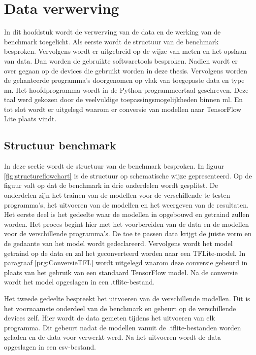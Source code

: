 \chapter{Data verwerving}
In dit hoofdstuk wordt de verwerving van de data en de werking van de benchmark toegelicht. Als eerste wordt de structuur van de benchmark besproken. Vervolgens wordt er uitgebreid op de wijze van meten en het opslaan van data. Dan worden de gebruikte softwaretools besproken. Nadien wordt er over gegaan op de devices die gebruikt worden in deze thesis. Vervolgens worden de gehanteerde programma's doorgenomen op vlak van toegepaste data en type \gls{nn}. Het hoofdprogramma wordt in de Python-programmeertaal geschreven. Deze taal werd gekozen door de veelvuldige toepassingsmogelijkheden binnen \gls{ml}. En tot slot wordt er uitgelegd waarom er conversie van modellen naar TensorFlow Lite plaats vindt.

\section{Structuur benchmark}
In deze sectie wordt de structuur van de benchmark besproken. In figuur \ref{fig:structureflowchart} is de structuur op schematische wijze gepresenteerd. Op de figuur valt op dat de benchmark in drie onderdelen wordt gesplitst. De onderdelen zijn het trainen van de modellen voor de verschillende te testen programma's, het uitvoeren van de modellen en het weergeven van de resultaten. \\

Het eerste deel is het gedeelte waar de modellen in opgebouwd en getraind zullen worden. Het proces begint hier met het voorbereiden van de data en de modellen voor de verschillende programma's. De toe te passen data krijgt de juiste vorm en de gedaante van het model wordt gedeclareerd. Vervolgens wordt het model getraind op de data en zal het geconverteerd worden naar een TFLite-model. In paragraaf \ref{prg:ConversieTFL} wordt uitgelegd waarom deze conversie gebeurd in plaats van het gebruik van een standaard TensorFlow model. Na de conversie wordt het model opgeslagen in een .tflite-bestand.

Het tweede gedeelte bespreekt het uitvoeren van de verschillende modellen. Dit is het voornaamste onderdeel van de benchmark en gebeurt op de verschillende devices zelf. Hier wordt de data gemeten tijdens het uitvoeren van elk programma. Dit gebeurt nadat de modellen vanuit de .tflite-bestanden worden geladen en de data voor verwerkt werd. Na het uitvoeren wordt de data opgeslagen in een \gls{csv}-bestand.

